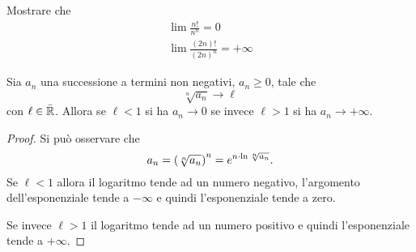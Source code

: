 \begin{exercise}
Mostrare che
\begin{gather*}
  \lim \frac{n!}{n^n} = 0 \\
  \lim \frac{(2n)!}{(2n)^n} = +\infty
\end{gather*}
\end{exercise}

\begin{theorem}
\label{th:criterio_radice}%
\mymark{***}%
%
%
Sia $a_n$ una successione a termini non negativi, $a_n\ge 0$, tale che
\[
  \sqrt[n]{a_n} \to \ell
\]
con $\ell \in \bar {{\mathbb R}}$.
Allora se $\ell<1$ si ha $a_n \to 0$ se invece $\ell > 1$ si ha $a_n \to +\infty$.
\end{theorem}
%
\begin{comment}
\begin{proof}
\mymark{**}
Consideriamo prima il caso $\ell < 1$.
Se $\lim \sqrt[n]{a_n} = \ell$ significa che per ogni $\eps>0$ la successione
$\sqrt[n]{a_n}$ risulta definitivamente minore di $\ell +\eps$.
Scegliendo opportunamente $\eps$ (ad esempio $\eps = (1-\ell)/2$) si potrà
avere $q = \ell+\eps < 1$. Dunque avremo definitivamente $\sqrt[n]{a_n}< q$
ovvero $a_n < q^n$. Per ipotesi $a_n\ge 0$
e quindi, tolto un numero finito di termini, si ottiene $0 \le a_n < q^n \to 0$
da cui $a_n \to 0$ (in quanto l'aver tolto un numero finito di termini non
cambia né il carattere né il limite della successione).

Se $\ell>1$ si potrà procedere in maniera analoga. Esisterà $q$ con $1 < q < \ell$ tale che definitivamente $\sqrt[n]{a_n} > q$ da cui $a_n > q^n \to +\infty$.
\end{proof}
\end{comment}

\begin{proof}
  Si può osservare che
  \[
    a_n = {\left( \sqrt[n]{a_n} \right)}^n
     = e^{n \cdot \ln \sqrt[n]{a_n}}.
  \]
  Se $\ell <1$ allora il logaritmo tende ad un numero negativo,
  l'argomento dell'esponenziale tende a $-\infty$ e quindi l'esponenziale tende a zero.

  Se invece $\ell>1$ il logaritmo tende ad un numero positivo e quindi l'esponenziale tende a $+\infty$.
\end{proof}

